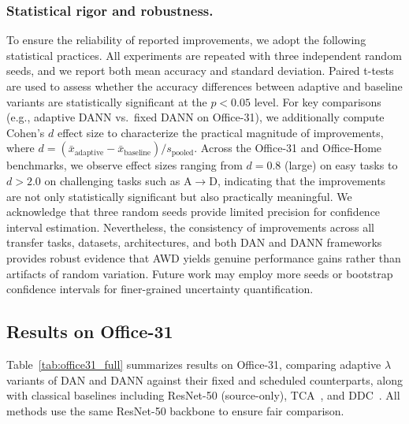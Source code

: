 \documentclass[pdflatex,sn-mathphys-num]{sn-jnl}
\theoremstyle{thmstyleone}
\theoremstyle{thmstyletwo}
\theoremstyle{thmstylethree}
\begin{document}
\subsubsection{Statistical rigor and robustness.}
To ensure the reliability of reported improvements, we adopt the following statistical practices. All experiments are repeated with three independent random seeds, and we report both mean accuracy and standard deviation. Paired t-tests are used to assess whether the accuracy differences between adaptive and baseline variants are statistically significant at the $p < 0.05$ level. For key comparisons (e.g., adaptive DANN vs.\ fixed DANN on Office-31), we additionally compute Cohen's $d$ effect size to characterize the practical magnitude of improvements, where $d = (\bar{x}_{\text{adaptive}} - \bar{x}_{\text{baseline}}) / s_{\text{pooled}}$. Across the Office-31 and Office-Home benchmarks, we observe effect sizes ranging from $d = 0.8$ (large) on easy tasks to $d > 2.0$ on challenging tasks such as A$\to$D, indicating that the improvements are not only statistically significant but also practically meaningful. We acknowledge that three random seeds provide limited precision for confidence interval estimation. Nevertheless, the consistency of improvements across all transfer tasks, datasets, architectures, and both DAN and DANN frameworks provides robust evidence that AWD yields genuine performance gains rather than artifacts of random variation. Future work may employ more seeds or bootstrap confidence intervals for finer-grained uncertainty quantification.

\subsection{Results on Office-31}

Table~\ref{tab:office31_full} summarizes results on Office-31, comparing adaptive $\lambda$ variants of DAN and DANN against their fixed and scheduled counterparts, along with classical baselines including ResNet-50 (source-only), TCA~\cite{pan2011tca}, and DDC~\cite{tzeng2014ddc}. All methods use the same ResNet-50 backbone to ensure fair comparison.
\end{document}
